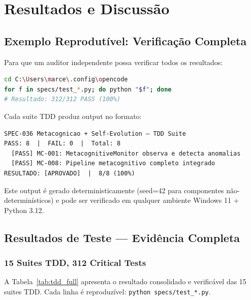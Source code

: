 \chapter{Resultados e Discussão}
\label{ch:resultados}

\section{Exemplo Reprodutível: Verificação Completa}



Para que um auditor independente possa verificar todos os resultados:

\begin{lstlisting}[language=bash, caption={Script de verificação completa — 312 CTs}]
cd C:\Users\marce\.config\opencode
for f in specs/test_*.py; do python "$f"; done
# Resultado: 312/312 PASS (100%)
\end{lstlisting}

Cada suite TDD produz output no formato:

\begin{verbatim}
SPEC-036 Metacognicao + Self-Evolution — TDD Suite
PASS: 8  |  FAIL: 0  |  Total: 8
  [PASS] MC-001: MetacognitiveMonitor observa e detecta anomalias
  [PASS] MC-008: Pipeline metacognitivo completo integrado
RESULTADO: [APROVADO]  |  8/8 (100%)
\end{verbatim}

Este output é gerado deterministicamente (seed=42 para componentes não-determinísticos) e pode ser verificado em qualquer ambiente Windows 11 + Python 3.12.

\section{Resultados de Teste — Evidência Completa}

\subsection{15 Suites TDD, 312 Critical Tests}

A Tabela~\ref{tab:tdd_full} apresenta o resultado consolidado e verificável das 15 suites TDD. Cada linha é reproduzível: \texttt{python specs/test\_*.py}.

